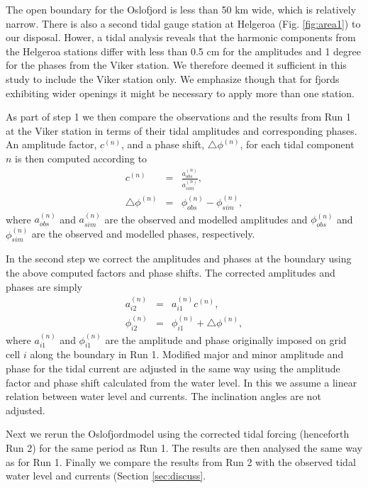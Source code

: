 The open boundary for the Oslofjord is less than 50 km wide, which is relatively narrow. There is also a second tidal gauge station at Helgeroa (Fig. \ref{fig:area1}) to our disposal. Hower, a tidal analysis reveals that the harmonic components from the Helgeroa stations differ with less than 0.5 cm for the amplitudes and 1 degree for the phases \cite[]{tide16} from the Viker station. We therefore deemed it sufficient in this study to include the Viker station only. We emphasize though that for fjords exhibiting wider openings it might be necessary to apply more than one station. 

As part of step 1 we then compare the observations and the results from Run 1 at the Viker station in terms of their tidal amplitudes and corresponding phases. An amplitude factor, $c^{(n)}$, and a phase shift, $\triangle \phi^{(n)}$, for each tidal component $n$ is then computed according to
\begin{eqnarray}
c^{(n)} &=& \frac{a^{(n)}_{obs}}{a^{(n)}_{sim}}, \\
\triangle \phi^{(n)} &=& \phi^{(n)}_{obs} - \phi^{(n)}_{sim},
\end{eqnarray}
where $a^{(n)}_{obs}$ and $a^{(n)}_{sim}$ are the observed and modelled amplitudes and $\phi^{(n)}_{obs}$ and $\phi^{(n)}_{sim}$ are the observed and modelled phases, respectively. 

In the second step we correct the amplitudes and phases at the boundary using the above computed factors and phase shifts. The corrected amplitudes and phases are simply
\begin{eqnarray}
a^{(n)}_{i2} &=& a^{(n)}_{i1} c^{(n)}, \\
\phi^{(n)}_{i2} &=& \phi^{(n)}_{i1} + \triangle \phi^{(n)},
\end{eqnarray}
where $a^{(n)}_{i1}$ and $\phi^{(n)}_{i1}$ are the amplitude and phase originally imposed on grid cell $i$ along the boundary in Run 1. Modified major and minor amplitude and phase for the tidal current are adjusted in the same way using the amplitude factor and phase shift calculated from the water level. In this we assume a linear relation between water level and currents. The inclination angles are not adjusted.

Next we rerun the Oslofjordmodel using the corrected tidal forcing (henceforth Run 2) for the same period as Run 1. The results are then analysed the same way as for Run 1. Finally we compare the results from Run 2 with the observed tidal water level and currents (Section \ref{sec:discuss}. 

